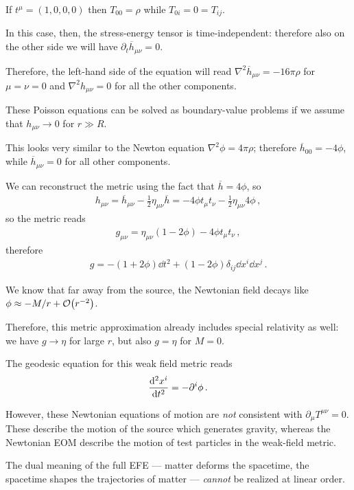\documentclass[main.tex]{subfiles}
\begin{document}
If \(t^{\mu } = (1, 0, 0, 0)\) then \(T_{00} = \rho \) while \(T_{0i} = 0 = T_{ij}\). 

In this case, then, the stress-energy tensor is time-independent: therefore also on the other side we will have \(\partial_{t} \overline{h}_{\mu \nu } = 0\).

Therefore, the left-hand side of the equation will read \(\nabla^2 \overline{h}_{\mu \nu } = - 16 \pi \rho  \) for \(\mu = \nu = 0\) and \(\nabla^2 h_{\mu \nu } = 0\) for all the other components. 

These Poisson equations can be solved as boundary-value problems if we assume that \(h_{\mu \nu } \to 0 \) for \(r \gg R\). 

This looks very similar to the Newton equation \(\nabla^2 \phi = 4 \pi \rho\); therefore \(\overline{h}_{00} = - 4 \phi \), while \(\overline{h}_{\mu \nu } = 0\) for all other components. 

We can reconstruct the metric using the fact that \(\overline{h} = 4 \phi   \), so 
%
\begin{align}
h_{\mu \nu } = \overline{h}_{\mu \nu } - \frac{1}{2} \eta_{\mu \nu } \overline{h} = - 4 \phi t_\mu t_\nu - \frac{1}{2} \eta_{\mu \nu } 4 \phi 
\,,
\end{align}
%
so the metric reads 
%
\begin{align}
g_{\mu \nu } = \eta_{\mu \nu } (1 - 2 \phi ) - 4 \phi t_\mu t_\nu 
\,,
\end{align}
%
therefore 
%
\begin{align}
g =  - (1 + 2 \phi ) \dd{t^2} + ( 1 - 2 \phi ) \delta_{ij} \dd{x^{i}} \dd{x^{j}}
\,.
\end{align}

We know that far away from the source, the Newtonian field decays like \(\phi \approx - M / r + \order{r^{-2}}\). 

Therefore, this metric approximation already includes special relativity as well: we have \(g \to \eta \) for large \(r\), but also \(g = \eta \) for \(M = 0\). 

The geodesic equation for this weak field metric reads 
%
\begin{align}
\dv[2]{x^{i}}{t} = - \partial^{i}\phi 
\,.
\end{align}

However, these Newtonian equations of motion are \emph{not} consistent with \(\partial_{\mu } T^{\mu \nu } = 0\). 
These describe the motion of the source which generates gravity, whereas the Newtonian EOM describe the motion of test particles in the weak-field metric. 

The dual meaning of the full EFE --- matter deforms the spacetime, the spacetime shapes the trajectories of matter --- \emph{cannot} be realized at linear order. 
\end{document}
